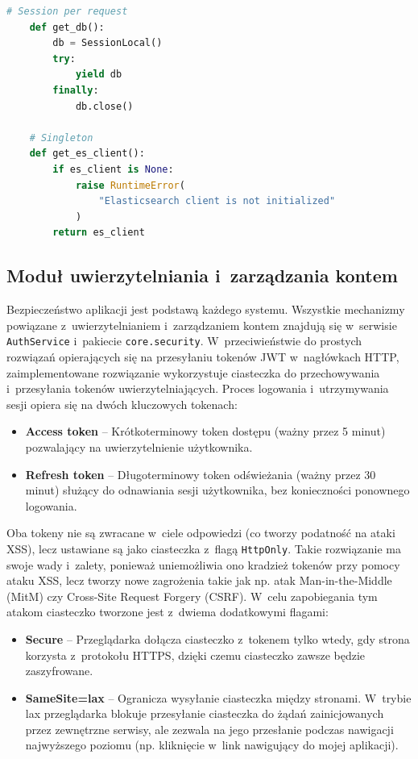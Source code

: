 \begin{lstlisting}[language=Python,
	caption={Strategie zarządzania cyklem życia obiektu},
	label={lst:cykl_zycia}]
    # Session per request
    def get_db():
        db = SessionLocal()
        try:
            yield db
        finally:
            db.close()
    
    # Singleton
    def get_es_client():
        if es_client is None:
            raise RuntimeError(
                "Elasticsearch client is not initialized"
            )
        return es_client
\end{lstlisting} 


\subsection{Moduł uwierzytelniania i~zarządzania kontem}
Bezpieczeństwo aplikacji jest podstawą każdego systemu. Wszystkie mechanizmy powiązane z~uwierzytelnianiem i~zarządzaniem kontem 
znajdują się w~serwisie \texttt{AuthService} i~pakiecie \texttt{core.security}. W~przeciwieństwie do prostych rozwiązań opierających 
się na przesyłaniu tokenów JWT w~nagłówkach HTTP, zaimplementowane rozwiązanie wykorzystuje ciasteczka do przechowywania i~przesyłania tokenów uwierzytelniających.
Proces logowania i~utrzymywania sesji opiera się na dwóch kluczowych tokenach:
\begin{itemize}
    \item \textbf{Access token} -- Krótkoterminowy token dostępu (ważny przez 5 minut) pozwalający na uwierzytelnienie użytkownika.
    \item \textbf{Refresh token} -- Długoterminowy token odświeżania (ważny przez 30 minut) służący do odnawiania sesji użytkownika, bez 
    konieczności ponownego logowania.
\end{itemize}
Oba tokeny nie są zwracane w~ciele odpowiedzi (co tworzy podatność na ataki XSS), lecz ustawiane są jako ciasteczka z~flagą \texttt{HttpOnly}. 
Takie rozwiązanie ma swoje wady i~zalety, ponieważ uniemożliwia ono kradzież tokenów przy pomocy ataku XSS, 
lecz tworzy nowe zagrożenia takie jak np. atak Man-in-the-Middle (MitM) czy Cross-Site Request Forgery (CSRF). W~celu zapobiegania tym 
atakom ciasteczko tworzone jest z~dwiema dodatkowymi flagami:
\begin{itemize}
    \item \textbf{Secure} -- Przeglądarka dołącza ciasteczko z~tokenem tylko wtedy, gdy strona korzysta z~protokołu HTTPS, dzięki czemu 
    ciasteczko zawsze będzie zaszyfrowane.
    \item \textbf{SameSite=lax} -- Ogranicza wysyłanie ciasteczka między stronami. W~trybie lax przeglądarka blokuje przesyłanie ciasteczka 
    do żądań zainicjowanych przez zewnętrzne serwisy, ale zezwala na jego przesłanie podczas nawigacji najwyższego poziomu (np. kliknięcie w~link nawigujący do
    mojej aplikacji).
\end{itemize}

